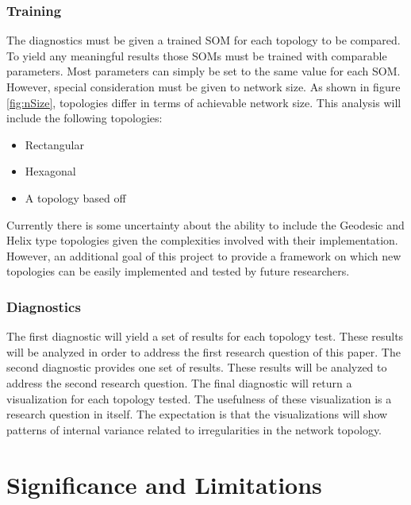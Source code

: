 \documentclass[10pt,titlepage]{article}
\begin{document}
\subsubsection{Training}
The diagnostics must be given a trained SOM for each topology to be compared. To
yield any meaningful results those SOMs must be trained with comparable
parameters. Most parameters can simply be set to the same value for each SOM.
However, special consideration must be given to network size.  As shown in
figure \ref{fig:nSize}, topologies differ in terms of achievable network size.
This analysis will include the following topologies:
\begin{itemize}
\item Rectangular
\item Hexagonal
\item A topology based off \cite{Rakhmanov94}
\end{itemize}
Currently there is some uncertainty about the ability to include the Geodesic
and Helix type topologies given the complexities involved with their
implementation. However, an additional goal of this project to provide a framework on
which new topologies can be easily implemented and tested by future
researchers.
\subsubsection{Diagnostics}
The first diagnostic will yield a set of results for each topology test.  These
results will be analyzed in order to address the first research question of this
paper.  The second diagnostic provides one set of results.  These results will
be analyzed to address the second research question.  The final diagnostic will
return a visualization for each topology tested.  The usefulness of these
visualization is a research question in itself.  The expectation is that the
visualizations will show patterns of internal variance related to irregularities
in the network topology.

\section{Significance and Limitations}


\end{document}
